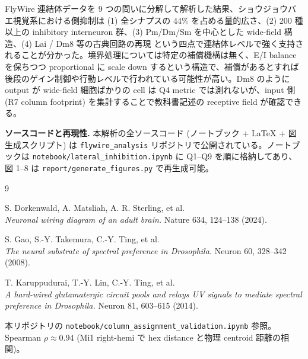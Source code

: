 \documentclass[11pt,a4paper]{ltjsarticle}
\begin{document}
FlyWire 連結体データを 9 つの問いに分解して解析した結果、ショウジョウバエ視覚系における側抑制は (1) 全シナプスの 44\% を占める量的広さ、(2) 200 種以上の inhibitory interneuron 群、(3) Pm/Dm/Sm を中心とした wide-field 構造、(4) Lai / Dm8 等の古典回路の再現 という四点で連結体レベルで強く支持されることが分かった。境界処理については特定の補償機構は無く、E/I balance を保ちつつ proportional に scale down するという構造で、補償があるとすれば後段のゲイン制御や行動レベルで行われている可能性が高い。Dm8 のように output が wide-field 細胞ばかりの cell は Q4 metric では測れないが、input 側 (R7 column footprint) を集計することで教科書記述の receptive field が確認できる。

\bigskip
\noindent\textbf{ソースコードと再現性.} 本解析の全ソースコード (ノートブック + LaTeX + 図生成スクリプト) は \texttt{flywire\_analysis} リポジトリで公開されている。ノートブックは \texttt{notebook/lateral\_inhibition.ipynb} に Q1--Q9 を順に格納してあり、図 1--8 は \texttt{report/generate\_figures.py} で再生成可能。

\begin{thebibliography}{9}

S. Dorkenwald, A. Matsliah, A. R. Sterling, et al.\\
\textit{Neuronal wiring diagram of an adult brain.}
Nature 634, 124--138 (2024).

S. Gao, S.-Y. Takemura, C.-Y. Ting, et al.\\
\textit{The neural substrate of spectral preference in Drosophila.}
Neuron 60, 328--342 (2008).

T. Karuppudurai, T.-Y. Lin, C.-Y. Ting, et al.\\
\textit{A hard-wired glutamatergic circuit pools and relays UV signals to mediate spectral preference in Drosophila.}
Neuron 81, 603--615 (2014).

本リポジトリの \texttt{notebook/column\_assignment\_validation.ipynb} 参照。
Spearman $\rho \approx 0.94$ (Mi1 right-hemi で hex distance と物理 centroid 距離の相関)。

\end{thebibliography}
\end{document}

